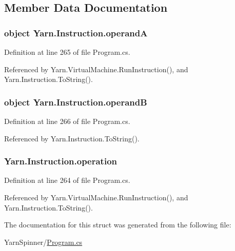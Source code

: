 \subsection{Member Data Documentation}
\hypertarget{a00109_ab5d386faa0d3dbc23db80f8e62706afd}{
\subsubsection[{operand\-A}]{\setlength{\rightskip}{0pt plus 5cm}object Yarn.\-Instruction.\-operand\-A}}\label{a00109_ab5d386faa0d3dbc23db80f8e62706afd}


Definition at line 265 of file Program.\-cs.



Referenced by Yarn.\-Virtual\-Machine.\-Run\-Instruction(), and Yarn.\-Instruction.\-To\-String().

\hypertarget{a00109_a56348c6fe7eb919b7277afc06e5b224a}{
\subsubsection[{operand\-B}]{\setlength{\rightskip}{0pt plus 5cm}object Yarn.\-Instruction.\-operand\-B}}\label{a00109_a56348c6fe7eb919b7277afc06e5b224a}


Definition at line 266 of file Program.\-cs.



Referenced by Yarn.\-Instruction.\-To\-String().

\hypertarget{a00109_a566bf5f7198cc353ea5c3710cb3a31cb}{
\subsubsection[{operation}]{ Yarn.\-Instruction.\-operation}}\label{a00109_a566bf5f7198cc353ea5c3710cb3a31cb}


Definition at line 264 of file Program.\-cs.



Referenced by Yarn.\-Virtual\-Machine.\-Run\-Instruction(), and Yarn.\-Instruction.\-To\-String().



The documentation for this struct was generated from the following file\-:\begin{DoxyCompactItemize}
\item 
Yarn\-Spinner/\hyperlink{a00296}{Program.\-cs}\end{DoxyCompactItemize}
